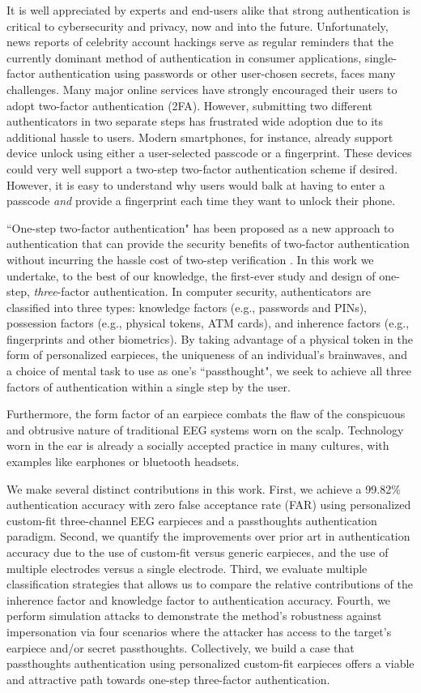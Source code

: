 \documentclass[a4paper,twoside]{article}
\begin{document}
\noindent It is well appreciated by experts and end-users alike that strong authentication is
critical to cybersecurity and privacy, now and into the future. Unfortunately,
news reports of celebrity account hackings serve as regular reminders that
the currently dominant method of authentication in consumer applications, 
single-factor authentication using passwords or other user-chosen secrets, 
faces many challenges. Many major online services have strongly encouraged 
their users to adopt two-factor authentication (2FA). However, submitting two 
different authenticators in two separate steps has frustrated wide adoption
due to its additional hassle to users. Modern smartphones, for instance,
already support device unlock using either a user-selected passcode or a fingerprint. These
devices could very well support a two-step two-factor authentication scheme if
desired. However, it is easy to understand why users would balk at having to
enter a passcode \emph{and} provide a fingerprint each time they want to unlock their phone.

``One-step two-factor authentication" has been proposed as a new approach
to authentication that can provide the security benefits of two-factor authentication 
without incurring the hassle cost of two-step verification \cite{Chuang2014}.
In this work we undertake, to the best of our knowledge, the first-ever study and design of 
one-step, \textit{three}-factor authentication. In computer security, authenticators are 
classified into three types: knowledge factors (e.g., passwords 
and PINs), possession factors (e.g., physical tokens, ATM cards), and inherence
factors (e.g., fingerprints and other biometrics). By taking advantage of a physical token 
in the form of personalized earpieces, the uniqueness of an individual's brainwaves, and
a choice of mental task to use as one's ``passthought", we seek to achieve all three factors 
of authentication within a single step by the user.

Furthermore, the form factor of an earpiece combats the flaw of the conspicuous and 
obtrusive nature of traditional EEG systems worn on the scalp. Technology worn in the 
ear is already a socially accepted practice in many cultures, with examples like 
earphones or bluetooth headsets.

We make several distinct contributions in this work. First, we achieve a 99.82\% authentication accuracy with zero false acceptance rate (FAR) using personalized custom-fit three-channel EEG earpieces and a passthoughts authentication paradigm. Second, we quantify the improvements over prior art in authentication accuracy due to the use of custom-fit versus generic earpieces, and the use of multiple electrodes versus a single electrode. Third, we evaluate multiple classification strategies that allows us to compare the relative contributions of the inherence factor and knowledge factor to authentication accuracy. Fourth, we perform simulation attacks to demonstrate the method's robustness against impersonation via four scenarios where the attacker has access to the target's earpiece and/or secret passthoughts. Collectively, we build a case that passthoughts authentication using personalized custom-fit earpieces offers a viable and attractive path towards one-step three-factor authentication.
\end{document}
